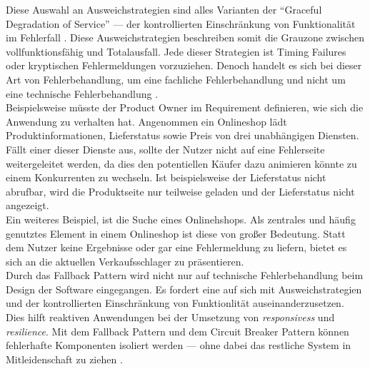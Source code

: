 Diese Auswahl an Ausweichstrategien sind alles Varianten der \enquote{Graceful Degradation of Service} --- der kontrollierten Einschränkung von Funktionalität im Fehlerfall \cite{friedrichsen_unkaputtbar_2014} \cite[S.~207]{newman_building_2015}. Diese Ausweichstrategien beschreiben somit die Grauzone zwischen vollfunktionsfähig und Totalausfall. Jede dieser Strategien ist Timing Failures oder kryptischen Fehlermeldungen vorzuziehen. Denoch handelt es sich bei dieser Art von Fehlerbehandlung, um eine fachliche Fehlerbehandlung und nicht um eine technische Fehlerbehandlung \cite{friedrichsen_unkaputtbar_2014}.\\
Beispielsweise müsste der Product Owner im Requirement definieren, wie sich die Anwendung zu verhalten hat. Angenommen ein Onlineshop lädt Produktinformationen, Lieferstatus sowie Preis von drei unabhängigen Diensten. Fällt einer dieser Dienste aus, sollte der Nutzer nicht auf eine Fehlerseite weitergeleitet werden, da dies den potentiellen Käufer dazu animieren könnte zu einem Konkurrenten zu wechseln. Ist beispielsweise der Lieferstatus nicht abrufbar, wird die Produktseite nur teilweise geladen und der Lieferstatus nicht angezeigt.\\
Ein weiteres Beispiel, ist die Suche eines Onlinehshops. Als zentrales und häufig genutztes Element in einem Onlineshop ist diese von großer Bedeutung. Statt dem Nutzer keine Ergebnisse oder gar eine Fehlermeldung zu liefern, bietet es sich an die aktuellen Verkaufsschlager zu präsentieren.\\

Durch das Fallback Pattern wird nicht nur auf technische Fehlerbehandlung beim Design der Software eingegangen. Es fordert eine auf sich mit Ausweichstrategien und der kontrollierten Einschränkung von Funktionlität auseinanderzusetzen. Dies hilft reaktiven Anwendungen bei der Umsetzung von \textit{responsivess} und \textit{resilience}. Mit dem Fallback Pattern und dem Circuit Breaker Pattern können fehlerhafte Komponenten isoliert werden --- ohne dabei das restliche System in Mitleidenschaft zu ziehen \cite[S.~71]{hanmer_patterns_2007}.

\pagebreak

